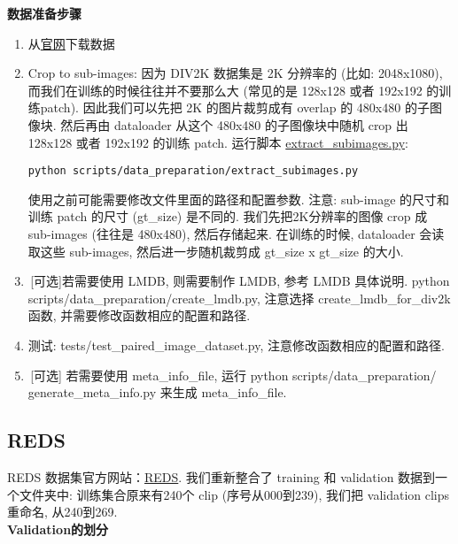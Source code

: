 \documentclass[../main.tex]{subfiles}
\begin{document}
\noindent\textbf{数据准备步骤}
\begin{enumerate}
\item 从\href{https://data.vision.ee.ethz.ch/cvl/DIV2K}{官网}下载数据
\item Crop to sub-images: 因为 DIV2K 数据集是 2K 分辨率的 (比如: 2048x1080), 而我们在训练的时候往往并不要那么大 (常见的是 128x128 或者 192x192 的训练patch). 因此我们可以先把 2K 的图片裁剪成有 overlap 的 480x480 的子图像块. 然后再由 dataloader 从这个 480x480 的子图像块中随机 crop 出 128x128 或者 192x192 的训练 patch.
运行脚本 \href{https://github.com/XPixelGroup/BasicSR/blob/master/scripts/data_preparation/extract_subimages.py}{extract\_subimages.py}:
\begin{verbatim}
python scripts/data_preparation/extract_subimages.py
\end{verbatim}
使用之前可能需要修改文件里面的路径和配置参数. 注意: sub-image 的尺寸和训练 patch 的尺寸 (gt\_size) 是不同的. 我们先把2K分辨率的图像 crop 成 sub-images (往往是 480x480), 然后存储起来. 在训练的时候, dataloader 会读取这些 sub-images, 然后进一步随机裁剪成 gt\_size x gt\_size 的大小.
\item\,[可选]若需要使用 LMDB, 则需要制作 LMDB, 参考 LMDB 具体说明. python scripts/data\_preparation/create\_lmdb.py, 注意选择 create\_lmdb\_for\_div2k 函数, 并需要修改函数相应的配置和路径.
\item 测试: tests/test\_paired\_image\_dataset.py, 注意修改函数相应的配置和路径.
\item\,[可选] 若需要使用 meta\_info\_file, 
运行 python scripts/data\_preparation/\\generate\_meta\_info.py 来生成 meta\_info\_file.
\end{enumerate}

\subsection{REDS}

REDS 数据集官方网站：\href{https://seungjunnah.github.io/Datasets/reds.html}{REDS}.
我们重新整合了 training 和 validation 数据到一个文件夹中: 训练集合原来有240个 clip (序号从000到239), 我们把 validation clips 重命名, 从240到269.\\

\noindent\textbf{Validation的划分}
\end{document}
